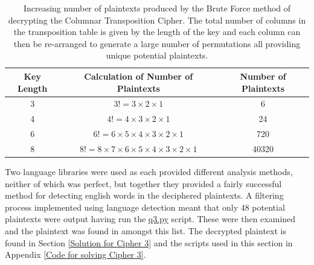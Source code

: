 \documentclass[a4paper,11pt]{article}
\begin{document}
		\begin{table}[h]
			\centering
			\scriptsize
			\begin{tabular}{|| c | c | c ||}
			\hline
			Key Length & Calculation of Number of Plaintexts & Number of Plaintexts \\
			\hline \hline
			3 & $3! = 3\times2\times1$ & 6 \\
			\hline
			4 & $4! = 4\times3\times2\times1$ & 24 \\
			\hline
			6 & $6! = 6\times5\times4\times3\times2\times1$ & 720 \\
			\hline
			8 & $8! = 8\times7\times6\times5\times4\times3\times2\times1$ & 40320 \\
			\hline
			\end{tabular}
			\captionsetup{width = 12cm}
			\caption{Increasing number of plaintexts produced by the Brute Force method of decrypting the Columnar Transposition Cipher. The total number of columns in the transposition table is given by the length of the key and each column can then be re-arranged to generate a large number of permutations all providing unique potential plaintexts.}
			\label{q3brute}
		\end{table}

	Two language libraries were used as each provided different analysis methods, neither of which was perfect, but together they provided a fairly successful method for detecting english words in the deciphered plaintexts. A filtering process implemented using language detection meant that only 48 potential plaintexts were output having run the \url{q3.py} script. These were then examined and the plaintext was found in amongst this list. The decrypted plaintext is found in Section \ref{Solution for Cipher 3} and the scripts used in this section in Appendix \ref{Code for solving Cipher 3}.
	
\end{document}

